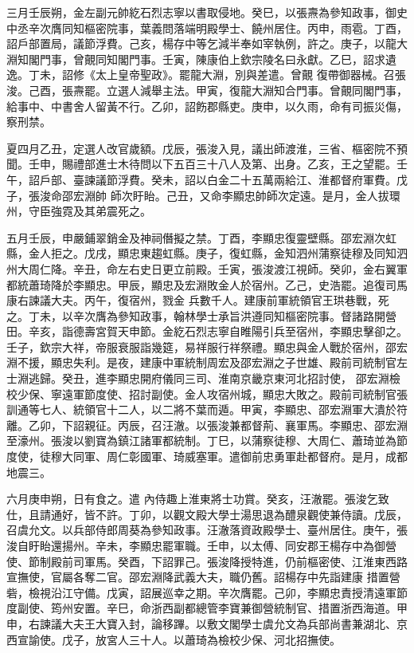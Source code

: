 \begin{pinyinscope}
 三月壬辰朔，金左副元帥紇石烈志寧以書取侵地。癸巳，以張燾為參知政事，御史中丞辛次膺同知樞密院事，葉義問落端明殿學士、饒州居住。丙申，雨雹。丁酉，詔戶部置局，議節浮費。己亥，楊存中等乞減半奉如宰執例，許之。庚子，以龍大淵知閣門事，曾覿同知閣門事。壬寅，陳康伯上欽宗陵名曰永獻。乙巳，詔求遺逸。丁未，詔修《太上皇帝聖政》。罷龍大淵，別與差遣。曾覿
 復帶御器械。召張浚。己酉，張燾罷。立選人減舉主法。甲寅，復龍大淵知合門事。曾覿同閣門事，給事中、中書舍人留黃不行。乙卯，詔飭郡縣吏。庚申，以久雨，命有司振災傷，察刑禁。



 夏四月乙丑，定選人改官歲額。戊辰，張浚入見，議出師渡淮，三省、樞密院不預聞。壬申，賜禮部進士木待問以下五百三十八人及第、出身。乙亥，王之望罷。壬午，詔戶部、臺諫議節浮費。癸未，詔以白金二十五萬兩給江、淮都督府軍費。戊子，張浚命邵宏淵帥
 師次盱眙。己丑，又命李顯忠帥師次定遠。是月，金人拔環州，守臣強霓及其弟震死之。



 五月壬辰，申嚴鋪翠銷金及神祠僭擬之禁。丁酉，李顯忠復靈壁縣。邵宏淵次虹縣，金人拒之。戊戌，顯忠東趨虹縣。庚子，復虹縣，金知泗州蒲察徒穆及同知泗州大周仁降。辛丑，命左右史日更立前殿。壬寅，張浚渡江視師。癸卯，金右翼軍都統蕭琦降於李顯忠。甲辰，顯忠及宏淵敗金人於宿州。乙己，史浩罷。追復司馬康右諫議大夫。丙午，復宿州，戮金
 兵數千人。建康前軍統領官王珙巷戰，死之。丁未，以辛次膺為參知政事，翰林學士承旨洪遵同知樞密院事。督諸路開營田。辛亥，詣德壽宮賀天申節。金紇石烈志寧自睢陽引兵至宿州，李顯忠擊卻之。壬子，欽宗大祥，帝服衰服詣幾筵，易祥服行祥祭禮。顯忠與金人戰於宿州，邵宏淵不援，顯忠失利。是夜，建康中軍統制周宏及邵宏淵之子世雄、殿前司統制官左士淵逃歸。癸丑，進李顯忠開府儀同三司、淮南京畿京東河北招討使，
 邵宏淵檢校少保、寧遠軍節度使、招討副使。金人攻宿州城，顯忠大敗之。殿前司統制官張訓通等七人、統領官十二人，以二將不葉而遁。甲寅，李顯忠、邵宏淵軍大潰於符離。乙卯，下詔親征。丙辰，召汪澈。以張浚兼都督荊、襄軍馬。李顯忠、邵宏淵至濠州。張浚以劉寶為鎮江諸軍都統制。丁巳，以蒲察徒穆、大周仁、蕭琦並為節度使，徒穆大同軍、周仁彰國軍、琦威塞軍。遣御前忠勇軍赴都督府。是月，成都地震三。



 六月庚申朔，日有食之。遣
 內侍趣上淮東將士功賞。癸亥，汪澈罷。張浚乞致仕，且請通好，皆不許。丁卯，以觀文殿大學士湯思退為醴泉觀使兼侍讀。戊辰，召虞允文。以兵部侍郎周葵為參知政事。汪澈落資政殿學士、臺州居住。庚午，張浚自盱眙還揚州。辛未，李顯忠罷軍職。壬申，以太傅、同安郡王楊存中為御營使、節制殿前司軍馬。癸酉，下詔罪己。張浚降授特進，仍前樞密使、江淮東西路宣撫使，官屬各奪二官。邵宏淵降武義大夫，職仍舊。詔楊存中先詣建康
 措置營砦，檢視沿江守備。戊寅，詔展巡幸之期。辛次膺罷。己卯，李顯忠責授清遠軍節度副使、筠州安置。辛巳，命浙西副都總管李寶兼御營統制官、措置浙西海道。甲申，右諫議大夫王大寶入封，論移蹕。以敷文閣學士虞允文為兵部尚書兼湖北、京西宣諭使。戊子，放宮人三十人。以蕭琦為檢校少保、河北招撫使。




\end{pinyinscope}
